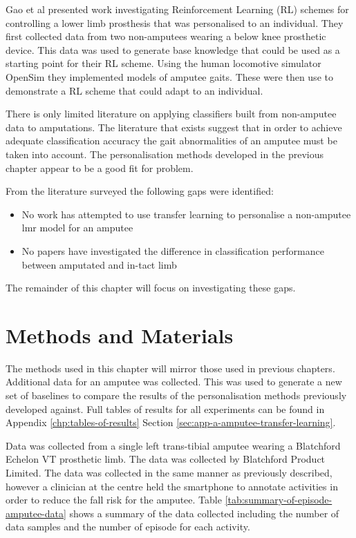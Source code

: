 Gao et al presented work investigating Reinforcement Learning (RL) schemes for controlling a lower limb prosthesis that was personalised to an individual. They first collected data from two non-amputees wearing a below knee prosthetic device. This data was used to generate base knowledge that could be used as a starting point for their RL scheme. Using the human locomotive simulator OpenSim they implemented models of amputee gaits. These were then use to demonstrate a RL scheme that could adapt to an individual.\cite{Gao2020a}

There is only limited literature on applying classifiers built from non-amputee data to amputations. The literature that exists suggest that in order to achieve adequate classification accuracy the gait abnormalities of an amputee must be taken into account. The personalisation methods developed in the previous chapter appear to be a good fit for problem.

From the literature surveyed the following gaps were identified:
\begin{itemize}
    \item No work has attempted to use transfer learning to personalise a non-amputee \acrshort{lmr} model for an amputee
    \item No papers have investigated the difference in classification performance between amputated and in-tact limb
\end{itemize}

The remainder of this chapter will focus on investigating these gaps.

\section{Methods and Materials}
\label{sec:amputee-methods}
The methods used in this chapter will mirror those used in previous chapters. Additional data for an amputee was collected. This was used to generate a new set of baselines to compare the results of the personalisation methods previously developed against. Full tables of results for all experiments can be found in  Appendix \ref{chp:tables-of-results} Section \ref{sec:app-a-amputee-transfer-learning}.

Data was collected from a single left trans-tibial amputee wearing a Blatchford Echelon VT prosthetic limb. The data was collected by Blatchford Product Limited. The data was collected in the same manner as previously described, however a clinician at the centre held the smartphone to annotate activities in order to reduce the fall risk for the amputee. Table \ref{tab:summary-of-episode-amputee-data} shows a summary of the data collected including the number of data samples and the number of episode for each activity.

